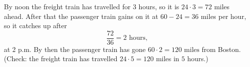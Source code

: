 By noon the freight train has travelled for $3$ hours, so it is $24\cdot3=72$ miles ahead. After that the passenger train gains on it at $60-24=36$ miles per hour, so it catches up after
\[
\dfrac{72}{36}=2\text{ hours},
\]
at 2 p.m. By then the passenger train has gone $60\cdot2=\boxed{120\text{ miles}}$ from Boston. (Check: the freight train has travelled $24\cdot5=120$ miles in $5$ hours.)

